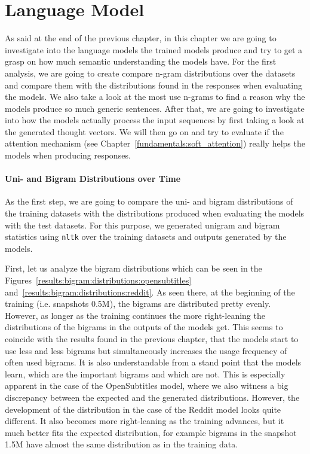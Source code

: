 \section{Language Model}
As said at the end of the previous chapter, in this chapter we are going to investigate into the language models the trained models produce and try to get a grasp on how much semantic understanding the models have. For the first analysis, we are going to create compare n-gram distributions over the datasets and compare them with the distributions found in the responses when evaluating the models. We also take a look at the most use n-grams to find a reason why the models produce so much generic sentences. After that, we are going to investigate into how the models actually process the input sequences by first taking a look at the generated thought vectors. We will then go on and try to evaluate if the attention mechanism (see Chapter~\ref{fundamentals:soft_attention}) really helps the models when producing responses.

\paragraph{Uni- and Bigram Distributions over Time}
As the first step, we are going to compare the uni- and bigram distributions of the training datasets with the distributions produced when evaluating the models with the test datasets. For this purpose, we generated unigram and bigram statistics using \texttt{nltk} over the training datasets and outputs generated by the models.

First, let us analyze the bigram distributions which can be seen in the Figures~\ref{results:bigram:distributions:opensubtitles} and~\ref{results:bigram:distributions:reddit}. As seen there, at the beginning of the training (i.e. snapshots 0.5M), the bigrams are distributed pretty evenly. However, as longer as the training continues the more right-leaning the distributions of the bigrams in the outputs of the models get. This seems to coincide with the results found in the previous chapter, that the models start to use less and less bigrams but simultaneously increases the usage frequency of often used bigrams. It is also understandable from a stand point that the models learn, which are the important bigrams and which are not. This is especially apparent in the case of the OpenSubtitles model, where we also witness a big discrepancy between the expected and the generated distributions. However, the development of the distribution in the case of the Reddit model looks quite different. It also becomes more right-leaning as the training advances, but it much better fits the expected distribution, for example bigrams in the snapshot 1.5M have almost the same distribution as in the training data.

